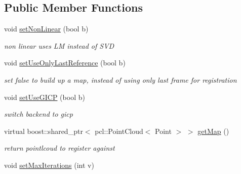 \subsection*{Public Member Functions}
\begin{DoxyCompactItemize}
\item 
\hypertarget{classRegistration__ICP_ab16c8d926cbfaefec2cfb5e29eceffab}{
void \hyperlink{classRegistration__ICP_ab16c8d926cbfaefec2cfb5e29eceffab}{setNonLinear} (bool b)}
\label{classRegistration__ICP_ab16c8d926cbfaefec2cfb5e29eceffab}

\begin{DoxyCompactList}\small\item\em non linear uses LM instead of SVD \item\end{DoxyCompactList}\item 
\hypertarget{classRegistration__ICP_a248f3d67674df34036faaccf7f69f014}{
void \hyperlink{classRegistration__ICP_a248f3d67674df34036faaccf7f69f014}{setUseOnlyLastReference} (bool b)}
\label{classRegistration__ICP_a248f3d67674df34036faaccf7f69f014}

\begin{DoxyCompactList}\small\item\em set false to build up a map, instead of using only last frame for registration \item\end{DoxyCompactList}\item 
\hypertarget{classRegistration__ICP_ae577aec867b0d2f350487dceba478b64}{
void \hyperlink{classRegistration__ICP_ae577aec867b0d2f350487dceba478b64}{setUseGICP} (bool b)}
\label{classRegistration__ICP_ae577aec867b0d2f350487dceba478b64}

\begin{DoxyCompactList}\small\item\em switch backend to gicp \item\end{DoxyCompactList}\item 
\hypertarget{classRegistration__ICP_a5eb9c15e9b4cf56f676a7e73d0855b82}{
virtual boost::shared\_\-ptr$<$ pcl::PointCloud$<$ Point $>$ $>$ \hyperlink{classRegistration__ICP_a5eb9c15e9b4cf56f676a7e73d0855b82}{getMap} ()}
\label{classRegistration__ICP_a5eb9c15e9b4cf56f676a7e73d0855b82}

\begin{DoxyCompactList}\small\item\em return pointlcoud to register against \item\end{DoxyCompactList}\item 
\hypertarget{classRegistration__ICP_a00182a197453a61cdd58108e0cd9fb6f}{
void \hyperlink{classRegistration__ICP_a00182a197453a61cdd58108e0cd9fb6f}{setMaxIterations} (int v)}
\label{classRegistration__ICP_a00182a197453a61cdd58108e0cd9fb6f}


\end{DoxyCompactItemize}
